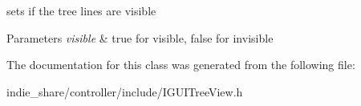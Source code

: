 sets if the tree lines are visible 


\begin{DoxyParams}{Parameters}
{\em visible} & true for visible, false for invisible \\
\hline
\end{DoxyParams}


The documentation for this class was generated from the following file\+:\begin{DoxyCompactItemize}
\item 
indie\+\_\+share/controller/include/I\+G\+U\+I\+Tree\+View.\+h\end{DoxyCompactItemize}
